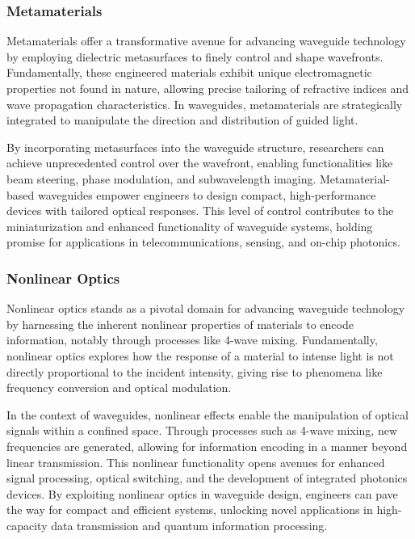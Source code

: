 \documentclass[10pt]{article}
\begin{document}
\subsubsection{Metamaterials}
Metamaterials offer a transformative avenue for advancing waveguide technology by employing dielectric
metasurfaces to finely control and shape wavefronts. Fundamentally, these engineered materials exhibit
unique electromagnetic properties not found in nature, allowing precise tailoring of refractive indices
and wave propagation characteristics. In waveguides, metamaterials are strategically integrated to manipulate
the direction and distribution of guided light.


By incorporating metasurfaces into the waveguide structure,
researchers can achieve unprecedented control over the wavefront,
enabling functionalities like beam steering, phase modulation, and subwavelength imaging.
Metamaterial-based waveguides empower engineers to design compact, high-performance devices with tailored optical responses.
This level of control contributes to the miniaturization and enhanced functionality of waveguide systems, holding promise
for applications in telecommunications, sensing, and on-chip photonics.


\subsubsection{Nonlinear Optics}
Nonlinear optics stands as a pivotal domain for advancing waveguide
technology by harnessing the inherent nonlinear properties of materials
to encode information, notably through processes like 4-wave mixing.
Fundamentally, nonlinear optics explores how the response of a material
to intense light is not directly proportional to the incident intensity,
giving rise to phenomena like frequency conversion and optical modulation.


In the context of waveguides, nonlinear effects enable the manipulation of
optical signals within a confined space. Through processes such as 4-wave mixing,
new frequencies are generated, allowing for information encoding in a manner beyond
linear transmission. This nonlinear functionality opens avenues for enhanced signal
processing, optical switching, and the development of integrated photonics devices.
By exploiting nonlinear optics in waveguide design, engineers can pave the way for
compact and efficient systems, unlocking novel applications in high-capacity data
transmission and quantum information processing.
\end{document}
